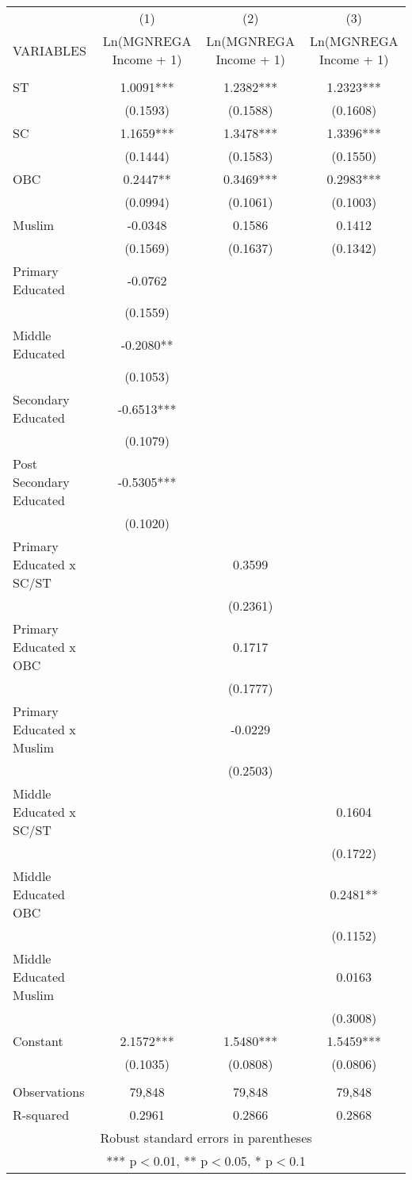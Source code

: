 \documentclass[]{article}
\begin{document}
\begin{tabular}{lccc} \hline
 & (1) & (2) & (3) \\
VARIABLES & Ln(MGNREGA Income + 1) & Ln(MGNREGA Income + 1) & Ln(MGNREGA Income + 1) \\ \hline
 &  &  &  \\
ST & 1.0091*** & 1.2382*** & 1.2323*** \\
 & (0.1593) & (0.1588) & (0.1608) \\
SC & 1.1659*** & 1.3478*** & 1.3396*** \\
 & (0.1444) & (0.1583) & (0.1550) \\
OBC & 0.2447** & 0.3469*** & 0.2983*** \\
 & (0.0994) & (0.1061) & (0.1003) \\
Muslim & -0.0348 & 0.1586 & 0.1412 \\
 & (0.1569) & (0.1637) & (0.1342) \\
Primary Educated & -0.0762 &  &  \\
 & (0.1559) &  &  \\
Middle Educated & -0.2080** &  &  \\
 & (0.1053) &  &  \\
Secondary Educated & -0.6513*** &  &  \\
 & (0.1079) &  &  \\
Post Secondary Educated & -0.5305*** &  &  \\
 & (0.1020) &  &  \\
Primary Educated x SC/ST &  & 0.3599 &  \\
 &  & (0.2361) &  \\
Primary Educated x OBC &  & 0.1717 &  \\
 &  & (0.1777) &  \\
Primary Educated x Muslim &  & -0.0229 &  \\
 &  & (0.2503) &  \\
Middle Educated x SC/ST &  &  & 0.1604 \\
 &  &  & (0.1722) \\
Middle Educated OBC &  &  & 0.2481** \\
 &  &  & (0.1152) \\
Middle Educated Muslim &  &  & 0.0163 \\
 &  &  & (0.3008) \\
Constant & 2.1572*** & 1.5480*** & 1.5459*** \\
 & (0.1035) & (0.0808) & (0.0806) \\
 &  &  &  \\
Observations & 79,848 & 79,848 & 79,848 \\
 R-squared & 0.2961 & 0.2866 & 0.2868 \\ \hline
\multicolumn{4}{c}{ Robust standard errors in parentheses} \\
\multicolumn{4}{c}{ *** p$<$0.01, ** p$<$0.05, * p$<$0.1} \\
\end{tabular}
\end{document}
